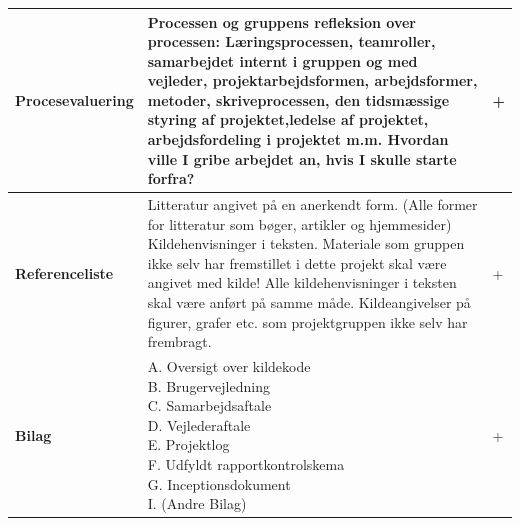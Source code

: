 \begin{longtable}{|p{30mm}|p{90mm}|p{25mm}|}
\textbf{Procesevaluering}   & Processen og gruppens refleksion over processen: Læringsprocessen, teamroller, samarbejdet internt i gruppen og med vejleder, projektarbejdsformen, arbejdsformer, metoder, skriveprocessen, den tidsmæssige styring af projektet,ledelse af projektet, arbejdsfordeling i projektet m.m. 
Hvordan ville I gribe arbejdet an, hvis I skulle starte forfra?
                                        &   +        \\ \hline

\textbf{Referenceliste}   & Litteratur angivet på en anerkendt form. 
(Alle former for litteratur som bøger, artikler og hjemmesider)
Kildehenvisninger i teksten. Materiale som gruppen ikke selv har fremstillet i dette projekt skal være angivet med kilde! 
Alle kildehenvisninger i teksten skal være anført på samme måde. Kildeangivelser på figurer, grafer etc. som projektgruppen ikke selv har frembragt. 
                                        &     +      \\ \hline

\textbf{Bilag}   &
\makecell[l]{
A. Oversigt over kildekode \\
B. Brugervejledning \\
C. Samarbejdsaftale \\
D. Vejlederaftale \\
E. Projektlog \\
F. Udfyldt rapportkontrolskema \\
G. Inceptionsdokument \\
I.  (Andre Bilag) \\
}
                                        &     +      \\ \hline

\end{longtable}

